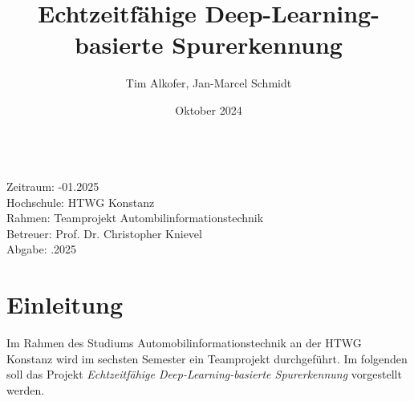 \documentclass{article}
\title{Echtzeitfähige Deep-Learning-basierte Spurerkennung}
\author{Tim Alkofer, Jan-Marcel Schmidt}
\date{Oktober 2024} %
\begin{document}
    
    \maketitle
    
    \begin{tabbing}
    \hspace{5em} \= \\
        Zeitraum: -01.2025 \\ %
        Hochschule: \> HTWG Konstanz \\
        Rahmen: \> Teamprojekt Autombilinformationstechnik \\
        Betreuer: \> Prof. Dr. Christopher Knievel \\
        Abgabe: .2025 \\ %
    \end{tabbing}

    \clearpage
    \tableofcontents
    \clearpage
    \listoffigures
    \clearpage
    \printbibliography
    \clearpage

    \section{Einleitung}
        Im Rahmen des Studiums Automobilinformationstechnik an der HTWG Konstanz wird im sechsten Semester ein Teamprojekt durchgeführt.
        Im folgenden soll das Projekt \textit{Echtzeitfähige Deep-Learning-basierte Spurerkennung} vorgestellt werden.
\end{document}
